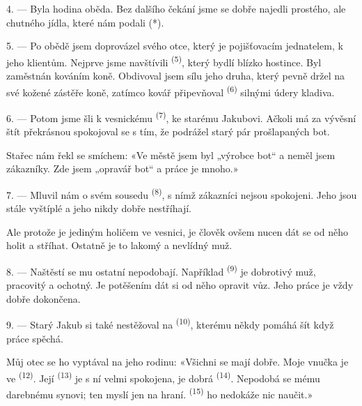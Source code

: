 4. --- Byla hodina oběda. Bez dalšího čekání jsme se dobře najedli prostého, ale
chutného jídla, které nám podali (*).

\VUsaut{3.0mm}

5. --- Po obědě jsem doprovázel svého otce, který je pojišťovacím jednatelem, k jeho
klientům. Nejprve jsme navštívili  \textsuperscript{(5)}, který bydlí
blízko hostince. Byl zaměstnán kováním koně. Obdivoval jsem sílu jeho druha, který
pevně držel na své kožené zástěře  koně, zatímco kovář připevňoval
 \textsuperscript{(6)} silnými údery kladiva.

6. --- Potom jsme šli k vesnickému  \textsuperscript{(7)}, ke starému
Jakubovi. Ačkoli má za vývěsní štít překrásnou  spokojoval se s tím, že
podrážel starý pár prošlapaných bot.

Stařec nám řekl se smíchem: «Ve městě jsem byl „výrobce bot“ a neměl jsem zákazníky.
Zde jsem „opravář bot“ a práce je mnoho.»

7. --- Mluvil nám o svém sousedu  \textsuperscript{(8)}, s nímž
zákazníci nejsou spokojeni. Jeho  jsou stále vyštíplé a jeho
 nikdy dobře nestříhají.

Ale protože je jediným holičem ve vesnici, je člověk ovšem nucen dát se od něho holit
a stříhat. Ostatně je to lakomý a nevlídný muž.

8. --- Naštěstí se mu ostatní  nepodobají. Například 
\textsuperscript{(9)} je dobrotivý muž, pracovitý a ochotný. Je potěšením dát si od něho
opravit vůz. Jeho práce je vždy dobře dokončena.

9. --- Starý Jakub si také nestěžoval na  \textsuperscript{(10)},
kterému někdy pomáhá šít  když práce spěchá.

Můj otec se ho vyptával na jeho rodinu: «Všichni se mají dobře. Moje vnučka je ve
 \textsuperscript{(12)}. Její  \textsuperscript{(13)} je
s ní velmi spokojena, je dobrá  \textsuperscript{(14)}. Nepodobá se mému
darebnému synovi; ten myslí jen na hraní.  \textsuperscript{(15)} ho
nedokáže nic naučit.»

\VUsaut{3.0mm}
\VUsaut{3.0mm}

